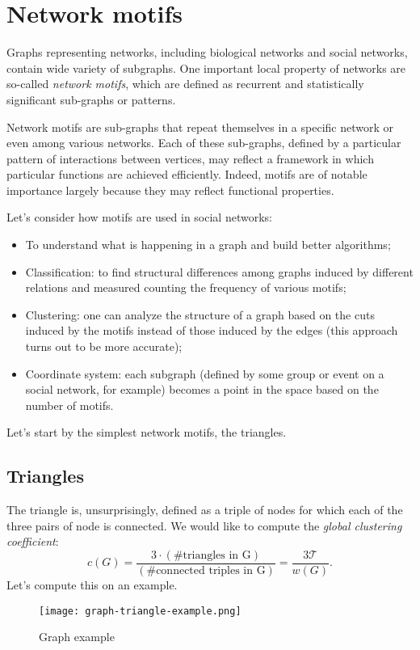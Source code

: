 \chapter{Network motifs}\label{sec:motifs}

Graphs representing networks, including biological networks and social networks, contain wide variety of subgraphs. One important local property of networks are so-called \emph{network motifs}, which are defined as recurrent and statistically significant sub-graphs or patterns.

Network motifs are sub-graphs that repeat themselves in a specific network or even among various networks. Each of these sub-graphs, defined by a particular pattern of interactions between vertices, may reflect a framework in which particular functions are achieved efficiently. Indeed, motifs are of notable importance largely because they may reflect functional properties.

Let's consider how motifs are used in social networks:
   \begin{itemize}
       \item To understand what is happening in a graph and build better algorithms;
       \item Classification: to find structural differences among graphs induced by different relations and measured counting the frequency of various motifs;
       \item Clustering: one can analyze the structure of a graph based on the cuts induced by the motifs instead of those induced by the edges (this approach turns out to be more accurate);
       \item Coordinate system: each subgraph (defined by some group or event on a social network, for example) becomes a point in the space based on the number of motifs.
   \end{itemize}

Let's start by the simplest network motifs, the triangles.


\section{Triangles}\label{sec:triangles}

The triangle is, unsurprisingly, defined as a triple of nodes for which each of the three pairs of node is connected. 
We would like to compute the \emph{global clustering coefficient}:
\begin{equation}\label{eq:clustering-coefficient}
    c(G) = \frac{3 \cdot \left(\text{\# triangles in G}\right)}{\left(\text{\# connected triples in G}\right)} = \frac{3 \mathcal{T}}{w(G)}.
\end{equation}
%
Let's compute this on an example.
%
\begin{figure}
	\centering
	\texttt{[image: graph-triangle-example.png]}
	\caption{Graph example}\label{fig:graph-example-triangles}
\end{figure}

